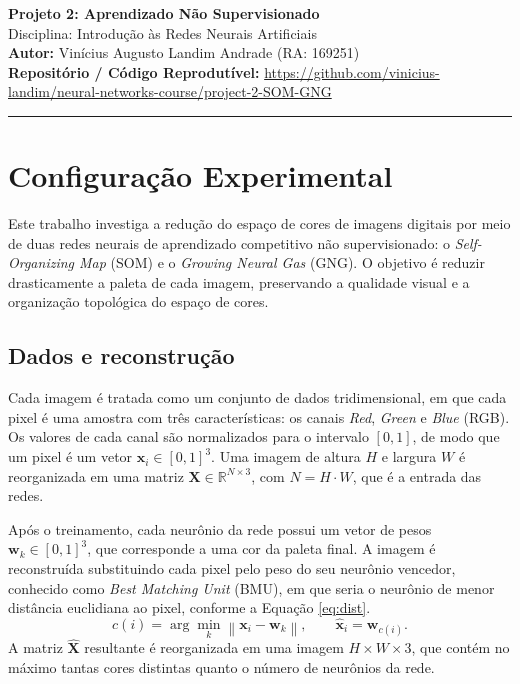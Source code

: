 \documentclass[11pt,a4paper]{article}
\begin{document}
\begin{center}
    {\LARGE \textbf{Projeto 2: Aprendizado Não Supervisionado}} \\[0.35em]
    {\large Disciplina: Introdução às Redes Neurais Artificiais} \\[0.3em]
    \textbf{Autor:} Vinícius Augusto Landim Andrade (RA: 169251) \\[0.2em]
    \textbf{Repositório / Código Reprodutível:} \url{https://github.com/vinicius-landim/neural-networks-course/project-2-SOM-GNG}
\end{center}
\vspace{-0.5em}
\hrule
\vspace{0.8em}

\section{Configuração Experimental}

Este trabalho investiga a redução do espaço de cores de imagens digitais por meio de duas redes neurais de aprendizado competitivo não supervisionado: o \textit{Self-Organizing Map} (SOM) e o \textit{Growing Neural Gas} (GNG). O objetivo é reduzir drasticamente a paleta de cada imagem, preservando a qualidade visual e a organização topológica do espaço de cores.

\subsection{Dados e reconstrução}

Cada imagem é tratada como um conjunto de dados tridimensional, em que cada
pixel é uma amostra com três características: os canais \textit{Red}, \textit{Green}
e \textit{Blue} (RGB). Os valores de cada canal são normalizados para o
intervalo $[0,1]$, de modo que um pixel é um vetor
$\mathbf{x}_i \in [0,1]^3$. Uma imagem de altura $H$ e largura $W$ é
reorganizada em uma matriz $\mathbf{X} \in \mathbb{R}^{N \times 3}$, com
$N = H \cdot W$, que é a entrada das redes.

Após o treinamento, cada neurônio da rede possui um vetor de pesos
$\mathbf{w}_k \in [0,1]^3$, que corresponde a uma cor da paleta final. A imagem é
reconstruída substituindo cada pixel pelo peso do seu neurônio vencedor, conhecido como \textit{Best Matching Unit} (BMU), em que seria o neurônio de menor distância
euclidiana ao pixel, conforme a Equação \ref{eq:dist}.
\begin{equation}
    \label{eq:dist}
  c(i) = \arg\min_{k} \left\lVert \mathbf{x}_i - \mathbf{w}_k \right\rVert,
  \qquad
  \hat{\mathbf{x}}_i = \mathbf{w}_{c(i)}.
\end{equation}
A matriz $\hat{\mathbf{X}}$ resultante é reorganizada em uma imagem
$H \times W \times 3$, que contém no máximo tantas cores distintas quanto o número
de neurônios da rede.
\end{document}
